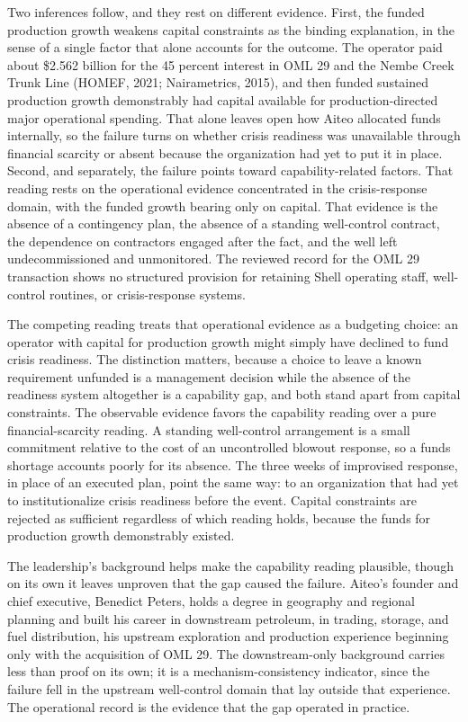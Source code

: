 Two inferences follow, and they rest on different evidence. First, the
funded production growth weakens capital constraints as the binding
explanation, in the sense of a single factor that alone accounts for the
outcome. The operator paid about \$2.562 billion for the 45 percent
interest in OML 29 and the Nembe Creek Trunk Line (HOMEF, 2021;
Nairametrics, 2015), and then funded sustained production growth
demonstrably had capital available for production-directed major
operational spending. That alone leaves open how Aiteo allocated funds
internally, so the failure turns on whether crisis readiness was
unavailable through financial scarcity or absent because the
organization had yet to put it in place. Second, and separately, the
failure points toward capability-related factors. That reading rests on
the operational evidence concentrated in the crisis-response domain,
with the funded growth bearing only on capital. That evidence is the
absence of a contingency plan, the absence of a standing well-control
contract, the dependence on contractors engaged after the fact, and the
well left undecommissioned and unmonitored. The reviewed record for the
OML 29 transaction shows no structured provision for retaining Shell
operating staff, well-control routines, or crisis-response systems.

The competing reading treats that operational evidence as a budgeting
choice: an operator with capital for production growth might simply have
declined to fund crisis readiness. The distinction matters, because a
choice to leave a known requirement unfunded is a management decision
while the absence of the readiness system altogether is a capability
gap, and both stand apart from capital constraints. The observable
evidence favors the capability reading over a pure financial-scarcity
reading. A standing well-control arrangement is a small commitment
relative to the cost of an uncontrolled blowout response, so a funds
shortage accounts poorly for its absence. The three weeks of improvised
response, in place of an executed plan, point the same way: to an
organization that had yet to institutionalize crisis readiness before
the event. Capital constraints are rejected as sufficient regardless of
which reading holds, because the funds for production growth
demonstrably existed.

The leadership's background helps make the capability reading plausible,
though on its own it leaves unproven that the gap caused the failure.
Aiteo's founder and chief executive, Benedict Peters, holds a degree in
geography and regional planning and built his career in downstream
petroleum, in trading, storage, and fuel distribution, his upstream
exploration and production experience beginning only with the
acquisition of OML 29. The downstream-only background carries less than
proof on its own; it is a mechanism-consistency indicator, since the
failure fell in the upstream well-control domain that lay outside that
experience. The operational record is the evidence that the gap operated
in practice.

